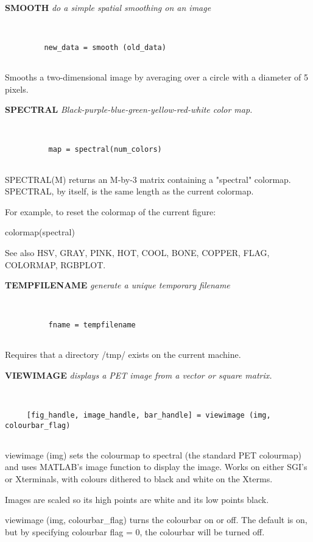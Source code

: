 {\large\bf SMOOTH} {\em  do a simple spatial smoothing on an image}
\begin{verbatim}


         new_data = smooth (old_data)


\end{verbatim}

  Smooths a two-dimensional image by averaging over a circle with a
  diameter of 5 pixels.
\endfunchelp


{\large\bf SPECTRAL} {\em Black-purple-blue-green-yellow-red-white color map.}
\begin{verbatim}


          map = spectral(num_colors)


\end{verbatim}

  SPECTRAL(M) returns an M-by-3 matrix containing a "spectral" colormap.
  SPECTRAL, by itself, is the same length as the current colormap.
 
  For example, to reset the colormap of the current figure:
 
            colormap(spectral)
 
  See also HSV, GRAY, PINK, HOT, COOL, BONE, COPPER, FLAG,
           COLORMAP, RGBPLOT.
\endfunchelp


{\large\bf TEMPFILENAME} {\em generate a unique temporary filename}
\begin{verbatim}


          fname = tempfilename


\end{verbatim}

  Requires that a directory /tmp/ exists on the current machine.
\endfunchelp


\endfunchelp


{\large\bf VIEWIMAGE} {\em  displays a PET image from a vector or square matrix.}
\begin{verbatim}


     [fig_handle, image_handle, bar_handle] = viewimage (img, colourbar_flag)


\end{verbatim}

   viewimage (img) sets the colourmap to spectral (the standard PET
   colourmap) and uses MATLAB's image function to display the image.
   Works on either SGI's or Xterminals, with colours dithered
   to black and white on the Xterms.
 
   Images are scaled so its high points are white and its low points black.
 
   viewimage (img, colourbar\_flag) turns the colourbar on or off.
   The default is on, but by specifying colourbar flag = 0, the
   colourbar will be turned off.
 
\endfunchelp


